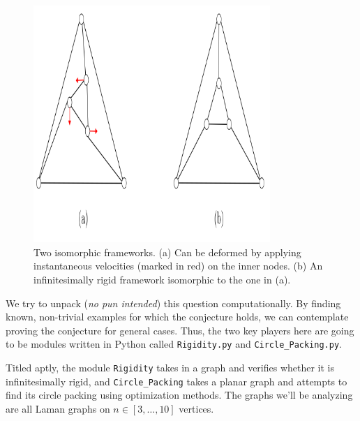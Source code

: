 \begin{figure}[htbp]
    \centering
    \includegraphics[width = 0.8\textwidth]{Chapter 4/2. Isomorphic but not inf rigid.png}
    \caption{Two isomorphic frameworks. (a) Can be deformed by applying instantaneous velocities (marked in red) on the inner nodes. (b) An infinitesimally rigid framework isomorphic to the one in (a).}
    \label{fig4: iso but not rig}
\end{figure}
\vspace{-3mm}
\begin{flushleft}
We try to unpack (\textit{no pun intended}) this question computationally. By finding known, non-trivial examples for which the conjecture holds, we can contemplate proving the conjecture for general cases. Thus, the two key players here are going to be modules written in Python called \texttt{Rigidity.py} and \texttt{Circle\_Packing.py}. 
\end{flushleft}

\begin{flushleft}
Titled aptly, the module \texttt{Rigidity} takes in a graph and verifies whether it is infinitesimally rigid, and \texttt{Circle\_Packing} takes a planar graph and attempts to find its circle packing using optimization methods. The graphs we'll be analyzing are all Laman graphs on $n \in [3, \hdots, 10]$ vertices.  
\end{flushleft}

